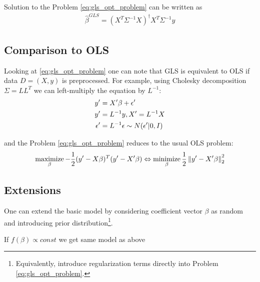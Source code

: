 Solution to the Problem \ref{eq:gls_opt_problem} can be written as
\begin{align}
	\hat{\beta}^{GLS} = (X^T \Sigma^{-1} X)^{\dagger} X^T \Sigma^{-1} y 
\end{align}

\subsection{Comparison to OLS}
Looking at \autoref{eq:gls_opt_problem} one can note that GLS is equivalent to OLS if data $D=(X, y)$ is preprocessed. For example, using Cholesky decomposition $\Sigma = L L^T  $ we can left-multiply the equation by $L^{-1}$:
\begin{align}
	y' &= X' \beta + \epsilon' \\
	y' &= L^{-1} y, X' = L^{-1} X \notag \\
	\epsilon' &= L^{-1} \epsilon \sim N(\epsilon' | 0, I) \notag
\end{align}

and the Problem \ref{eq:gls_opt_problem} reduces to the usual OLS problem: 
\begin{align}
	\label{eq:gls_opt_problem_eq}
	\operatorname*{maximize}_{\beta} -\frac{1}{2} (y' - X\beta)^T  (y' - X' \beta)  \Leftrightarrow \operatorname*{minimize}_{\beta} \frac{1}{2} \left\| y' - X' \beta \right\|_2^2
\end{align}

\subsection{Extensions}
One can extend the basic model by considering coefficient vector $\beta$ as random and introducing prior distribution\footnote{Equivalently, introduce regularization terms directly into Problem \ref{eq:gls_opt_problem}.}.

If $f(\beta) \propto const$ we get same model as above





